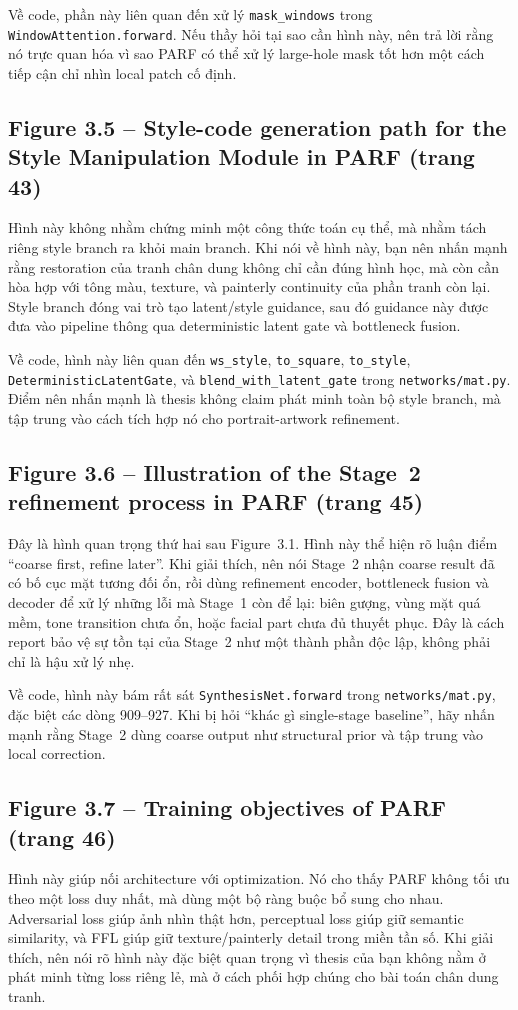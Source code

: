 \documentclass[12pt,a4paper]{article}
\begin{document}
Về code, phần này liên quan đến xử lý \texttt{mask\_windows} trong \texttt{WindowAttention.forward}. Nếu thầy hỏi tại sao cần hình này, nên trả lời rằng nó trực quan hóa vì sao PARF có thể xử lý large-hole mask tốt hơn một cách tiếp cận chỉ nhìn local patch cố định.

\subsection*{Figure 3.5 -- Style-code generation path for the Style Manipulation Module in PARF (trang 43)}
Hình này không nhằm chứng minh một công thức toán cụ thể, mà nhằm tách riêng style branch ra khỏi main branch. Khi nói về hình này, bạn nên nhấn mạnh rằng restoration của tranh chân dung không chỉ cần đúng hình học, mà còn cần hòa hợp với tông màu, texture, và painterly continuity của phần tranh còn lại. Style branch đóng vai trò tạo latent/style guidance, sau đó guidance này được đưa vào pipeline thông qua deterministic latent gate và bottleneck fusion.

Về code, hình này liên quan đến \texttt{ws\_style}, \texttt{to\_square}, \texttt{to\_style}, \texttt{DeterministicLatentGate}, và \texttt{blend\_with\_latent\_gate} trong \texttt{networks/mat.py}. Điểm nên nhấn mạnh là thesis không claim phát minh toàn bộ style branch, mà tập trung vào cách tích hợp nó cho portrait-artwork refinement.

\subsection*{Figure 3.6 -- Illustration of the Stage~2 refinement process in PARF (trang 45)}
Đây là hình quan trọng thứ hai sau Figure~3.1. Hình này thể hiện rõ luận điểm ``coarse first, refine later''. Khi giải thích, nên nói Stage~2 nhận coarse result đã có bố cục mặt tương đối ổn, rồi dùng refinement encoder, bottleneck fusion và decoder để xử lý những lỗi mà Stage~1 còn để lại: biên gượng, vùng mặt quá mềm, tone transition chưa ổn, hoặc facial part chưa đủ thuyết phục. Đây là cách report bảo vệ sự tồn tại của Stage~2 như một thành phần độc lập, không phải chỉ là hậu xử lý nhẹ.

Về code, hình này bám rất sát \texttt{SynthesisNet.forward} trong \texttt{networks/mat.py}, đặc biệt các dòng 909--927. Khi bị hỏi ``khác gì single-stage baseline'', hãy nhấn mạnh rằng Stage~2 dùng coarse output như structural prior và tập trung vào local correction.

\subsection*{Figure 3.7 -- Training objectives of PARF (trang 46)}
Hình này giúp nối architecture với optimization. Nó cho thấy PARF không tối ưu theo một loss duy nhất, mà dùng một bộ ràng buộc bổ sung cho nhau. Adversarial loss giúp ảnh nhìn thật hơn, perceptual loss giúp giữ semantic similarity, và FFL giúp giữ texture/painterly detail trong miền tần số. Khi giải thích, nên nói rõ hình này đặc biệt quan trọng vì thesis của bạn không nằm ở phát minh từng loss riêng lẻ, mà ở cách phối hợp chúng cho bài toán chân dung tranh.
\end{document}
